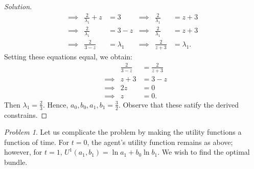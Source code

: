 \documentclass[12pt]{article}
\theoremstyle{definition}
\theoremstyle{remark}
\newtheorem{prob}{Problem}[section]
\def\la{\lambda}
\begin{document}
\begin{proof}[Solution]
\begin{align*}
    & \implies  & \frac{2}{\la_1} + z &= 3      & \implies & \frac{2}{\la_1} &= z + 3 & \\
    & \implies  & \frac{2}{\la_1} &= 3 - z      & \implies & \frac{2}{\la_1} &= z + 3 & \\
    & \implies  & \frac{2}{3 - z} &= \la_1      & \implies & \frac{2}{z + 3} &= \la_1. &
  \end{align*}
  Setting these equations equal, we obtain:
  \begin{align*}
    &          & \frac{2}{3 - z} &= \frac{2}{z + 3} \\
    & \implies & z + 3 &= 3 - z \\
    & \implies & 2z &= 0 \\
    & \implies & z &= 0.
  \end{align*}
  Then $\la_1 = \frac{2}{3}$. Hence, $a_0, b_0, a_1, b_1 = \frac{3}{2}$. Observe that these satify the derived constrains.
\end{proof}
\begin{prob}
  Let us complicate the problem by making the utility functions a function of time. For $t = 0$, the agent's utility function remains as above; however, for $t = 1$, $U^1(a_1, b_1) = \ln a_1 + b_0\ln b_1$. We wish to find the optimal bundle.
\end{prob}
\end{document}
